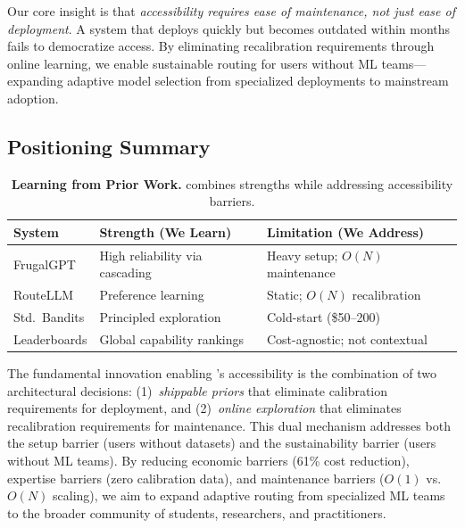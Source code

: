 Our core insight is that \emph{accessibility requires ease of maintenance, not just ease of deployment}. A system that deploys quickly but becomes outdated within months fails to democratize access. By eliminating recalibration requirements through online learning, we enable sustainable routing for users without ML teams---expanding adaptive model selection from specialized deployments to mainstream adoption.

\subsection{Positioning Summary}

\begin{table}[t]
\centering
\footnotesize
\caption{\textbf{Learning from Prior Work.} \ours{} combines strengths while addressing accessibility barriers.}
\label{tab:related_comparison}
\begin{tabular}{p{2.0cm}p{2.6cm}p{2.2cm}}
\toprule
\textbf{System} & \textbf{Strength (We Learn)} & \textbf{Limitation (We Address)} \\
\midrule
FrugalGPT & High reliability via cascading & Heavy setup; $O(N)$ maintenance \\
RouteLLM & Preference learning & Static; $O(N)$ recalibration \\
Std.\ Bandits & Principled exploration & Cold-start (\$50--200) \\
Leaderboards & Global capability rankings & Cost-agnostic; not contextual \\
\bottomrule
\end{tabular}
\end{table}

The fundamental innovation enabling \ours{}'s accessibility is the combination of two architectural decisions: (1)~\emph{shippable priors} that eliminate calibration requirements for deployment, and (2)~\emph{online exploration} that eliminates recalibration requirements for maintenance. This dual mechanism addresses both the setup barrier (users without datasets) and the sustainability barrier (users without ML teams). By reducing economic barriers (61\% cost reduction), expertise barriers (zero calibration data), and maintenance barriers ($O(1)$ vs.\ $O(N)$ scaling), we aim to expand adaptive routing from specialized ML teams to the broader community of students, researchers, and practitioners.

